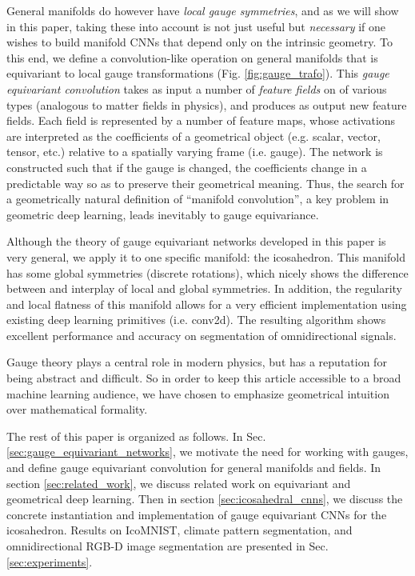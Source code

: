 \documentclass{article}
\begin{document}
General manifolds do however have \emph{local gauge symmetries}, and as we will show in this paper, taking these into account is not just useful but \emph{necessary} if one wishes to build manifold CNNs that depend only on the intrinsic geometry.
To this end, we define a convolution-like operation on general manifolds  that is equivariant to local gauge transformations (Fig. \ref{fig:gauge_trafo}).
This \emph{gauge equivariant convolution} takes as input a number of \emph{feature fields} on  of various types (analogous to matter fields in physics), and produces as output new feature fields.
Each field is represented by a number of feature maps, whose activations are interpreted as the coefficients of a geometrical object (e.g. scalar, vector, tensor, etc.) relative to a spatially varying frame (i.e. gauge).
The network is constructed such that if the gauge is changed, the coefficients change in a predictable way so as to preserve their geometrical meaning.
Thus, the search for a geometrically natural definition of ``manifold convolution'', a key problem in geometric deep learning, leads inevitably to gauge equivariance.

Although the theory of gauge equivariant networks developed in this paper is very general, we apply it to one specific manifold: the icosahedron.
This manifold has some global symmetries (discrete rotations), which nicely shows the difference between and interplay of local and global symmetries.
In addition, the regularity and local flatness of this manifold allows for a very efficient implementation using existing deep learning primitives (i.e. conv2d).
The resulting algorithm shows excellent performance and accuracy on segmentation of omnidirectional signals.

Gauge theory plays a central role in modern physics, but has a reputation for being abstract and difficult.
So in order to keep this article accessible to a broad machine learning audience, we have chosen to emphasize geometrical intuition over mathematical formality.

The rest of this paper is organized as follows.
In Sec. \ref{sec:gauge_equivariant_networks},
we motivate the need for working with gauges, and define gauge equivariant convolution for general manifolds and fields.
In section \ref{sec:related_work}, we discuss related work on equivariant and geometrical deep learning.
Then in section \ref{sec:icosahedral_cnns}, we discuss the concrete instantiation and implementation of gauge equivariant CNNs for the icosahedron.
Results on IcoMNIST, climate pattern segmentation, and omnidirectional RGB-D image segmentation are presented in Sec. \ref{sec:experiments}.
\end{document}
